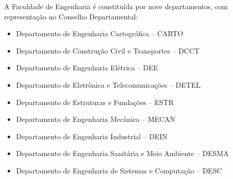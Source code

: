 A Faculdade de Engenharia é constituída por nove departamentos, com representação no Conselho Departamental: 

\begin{itemize}
\item Departamento de Engenharia Cartográfica – CARTO
\item Departamento de Construção Civil e Transportes – DCCT
\item Departamento de Engenharia Elétrica – DEE
\item Departamento de Eletrônica e Telecomunicações – DETEL
\item Departamento de Estruturas e Fundações – ESTR
\item Departamento de Engenharia Mecânica – MECAN
\item Departamento de Engenharia Industrial – DEIN
\item Departamento de Engenharia Sanitária e Meio Ambiente – DESMA
\item Departamento de Engenharia de Sistemas e Computação – DESC
\end{itemize}

